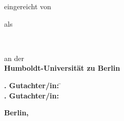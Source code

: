 \makeatletter
\begin{titlepage}
\doublespacing\centering%
\vspace*{-24.5mm}\noindent\makebox[\textwidth]{\phantom{Vadid Gissnkra}\hspace*{-19mm}}

\textbf{\Huge\sffamily \@title}\vskip 2.5mm

\textbf{\Large\sffamily \@subtitle}\vfill

{\large eingereicht von}\\
\resizebox{%
      \ifdim\width>\textwidth
        \textwidth
      \else
        \width
      \fi
    }{!}{%
    \textbf{\Large\sffamily \@author}}\vfill

{\large als}\\
    \textbf{\Large\sffamily\degreevar}\vfill

{\large\degreecontextvar}\\
\resizebox{%
      \ifdim\width>\textwidth
        \textwidth
      \else
        \width
      \fi
    }{!}{%
    \textbf{\Large\sffamily\programmevar}}\vfill

{\large an der}\\
\textbf{\Large\sffamily Humboldt-Universität zu Berlin}\vfill

\resizebox{%
      \ifdim\width>\textwidth
        \textwidth
      \else
        \width
      \fi
    }{!}{%
    \textbf{\Large\sffamily\facultyvar}}

\resizebox{%
      \ifdim\width>\textwidth
        \textwidth
      \else
        \width
      \fi
    }{!}{%
    \textbf{\Large\sffamily\institutevar}}\vfill

\parbox{0cm}{\large%
    \begin{tabbing}
        \textbf{. Gutachter/in:} \= \firstsupervisorvar\\
        \textbf{. Gutachter/in:} \> \secondsupervisorvar
    \end{tabbing}
}\vfill


\enlargethispage{16mm}\textbf{\large\sffamily Berlin, \@date}
\end{titlepage}
\makeatother